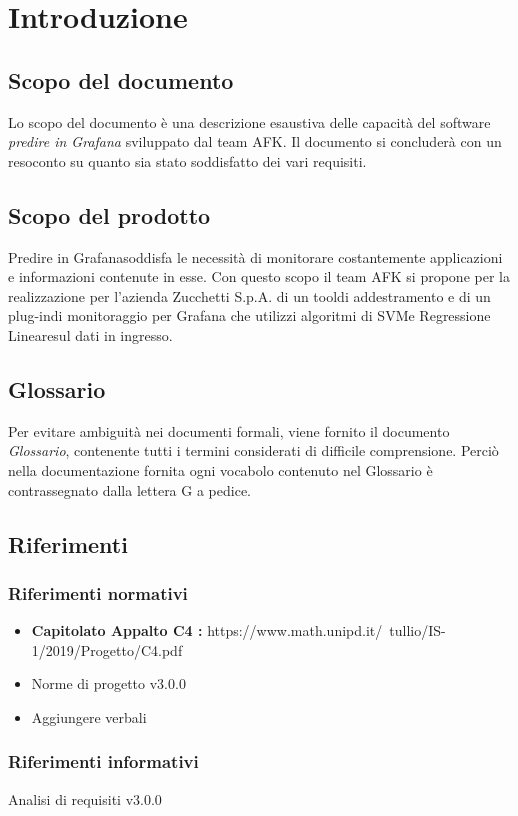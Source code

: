 \section{Introduzione}

\subsection{Scopo del documento}
Lo scopo del documento è una descrizione esaustiva delle capacità del software \textit{predire in Grafana} sviluppato dal team AFK.
Il documento si concluderà con un resoconto su quanto sia stato soddisfatto dei vari requisiti.

\subsection{Scopo del prodotto}
Predire in Grafana\glo soddisfa le necessità di monitorare costantemente applicazioni e informazioni contenute in esse. 
Con questo scopo il team AFK si propone per la realizzazione per l’azienda Zucchetti S.p.A. di un tool\glo di addestramento e di un plug-in\glo di monitoraggio per Grafana che utilizzi algoritmi di SVM\glo e Regressione Lineare\glo sul dati in ingresso.


\subsection{Glossario}
Per evitare ambiguità nei documenti formali, viene fornito il documento \textit{Glossario}, contenente tutti i termini considerati di difficile comprensione. Perciò nella documentazione fornita ogni vocabolo contenuto nel Glossario è contrassegnato dalla lettera G a pedice.

\subsection{Riferimenti}

\subsubsection{Riferimenti normativi}
\begin{itemize}
	\item
	\textbf{Capitolato Appalto C4 :} https://www.math.unipd.it/~tullio/IS-1/2019/Progetto/C4.pdf
	\item 
	Norme di progetto v3.0.0
	\item
	Aggiungere verbali
\end{itemize}

\subsubsection{Riferimenti informativi}
	\item 
	Analisi di requisiti v3.0.0
	